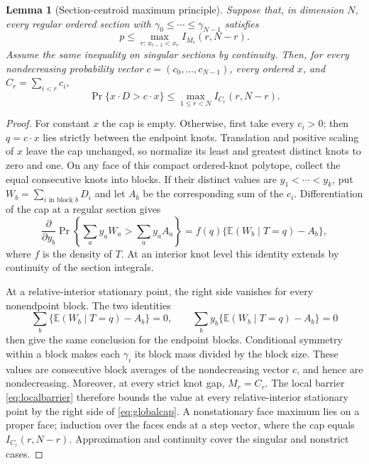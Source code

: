 \documentclass[11pt]{article}
\newtheorem{lemma}[theorem]{Lemma}
\theoremstyle{definition}
\newcommand{\E}{\mathbb{E}}
\begin{document}
\begin{lemma}[Section-centroid maximum principle]\label{lem:sectionmaximum}
Suppose that, in dimension $N$, every regular ordered section with
$\gamma_0\le\cdots\le\gamma_{N-1}$ satisfies
\begin{equation}\label{eq:localbarrier}
 p\le \max_{r:\,x_{r-1}<x_r} I_{M_r}(r,N-r).
\end{equation}
Assume the same inequality on singular sections by continuity.  Then, for
every nondecreasing probability vector $c=(c_0,\ldots,c_{N-1})$, every
ordered $x$, and $C_r=\sum_{i<r}c_i$,
\begin{equation}\label{eq:globalcap}
 \Pr\{x\mathbin{\cdot}D>c\mathbin{\cdot}x\}
 \le \max_{1\le r<N} I_{C_r}(r,N-r).
\end{equation}
\end{lemma}

\begin{proof}
For constant $x$ the cap is empty. Otherwise, first take every $c_i>0$;
then $q=c\mathbin{\cdot}x$ lies strictly between the endpoint knots.
Translation and positive scaling of $x$ leave the cap unchanged, so normalize
its least and greatest distinct knots to zero and one.  On any face of this
compact ordered-knot polytope, collect the equal consecutive knots into
blocks.  If their distinct values are $y_1<\cdots<y_k$, put
$W_b=\sum_{i\text{ in block }b}D_i$ and let $A_b$ be the corresponding sum
of the $c_i$.  Differentiation of the cap at a regular section gives
\begin{equation}\label{eq:capderivative}
 \frac{\partial}{\partial y_b}
 \Pr\!\left\{\sum_a y_aW_a>\sum_a y_aA_a\right\}
 =f(q)\{\E(W_b\mid T=q)-A_b\},
\end{equation}
where $f$ is the density of $T$. At an interior knot level this identity
extends by continuity of the section integrals.

At a relative-interior stationary point, the right side vanishes for every
nonendpoint block.  The two identities
\[
 \sum_b\{\E(W_b\mid T=q)-A_b\}=0,
 \qquad
 \sum_b y_b\{\E(W_b\mid T=q)-A_b\}=0
\]
then give the same conclusion for the endpoint blocks.  Conditional symmetry
within a block makes each $\gamma_i$ its block mass divided by the block
size.  These values are consecutive block averages of the nondecreasing
vector $c$, and hence are nondecreasing.  Moreover, at every strict knot gap,
$M_r=C_r$.  The local barrier \eqref{eq:localbarrier} therefore bounds the
value at every relative-interior stationary point by the right side of
\eqref{eq:globalcap}.  A nonstationary face maximum lies on a proper face;
induction over the faces ends at a step vector, where the cap equals
$I_{C_r}(r,N-r)$.  Approximation and continuity cover the singular and
nonstrict cases.
\end{proof}
\end{document}
